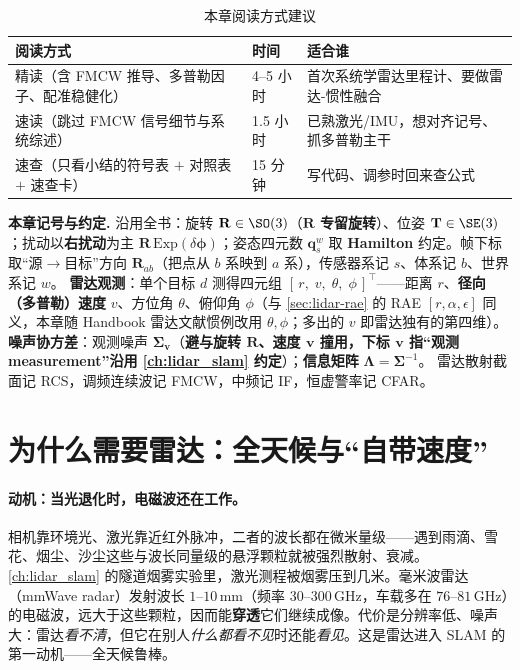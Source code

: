 \begin{table}[H]\centering\small
\caption{本章阅读方式建议}
\label{tab:radar-reading}
\begin{tabular}{lll}
\toprule
阅读方式 & 时间 & 适合谁 \\
\midrule
精读（含 FMCW 推导、多普勒因子、配准稳健化） & 4--5 小时 & 首次系统学雷达里程计、要做雷达-惯性融合 \\
速读（跳过 FMCW 信号细节与系统综述） & 1.5 小时 & 已熟激光/IMU，想对齐记号、抓多普勒主干 \\
速查（只看小结的符号表 $+$ 对照表 $+$ 速查卡） & 15 分钟 & 写代码、调参时回来查公式 \\
\bottomrule
\end{tabular}
\end{table}

\begin{note}
\textbf{本章记号与约定.}\;
沿用全书：旋转 $\mathbf R\in\SO(3)$（\textbf{$\mathbf R$ 专留旋转}）、位姿 $\mathbf T\in\SE(3)$；扰动以\textbf{右扰动}为主 $\mathbf R\,\mathrm{Exp}(\delta\boldsymbol\phi)$；姿态四元数 $\mathbf q_s^w$ 取 \textbf{Hamilton} 约定。帧下标取“源$\to$目标”方向 $\mathbf R_{ab}$（把点从 $b$ 系映到 $a$ 系），传感器系记 $s$、体系记 $b$、世界系记 $w$。
\textbf{雷达观测}：单个目标 $d$ 测得四元组 $[\,r,\;v,\;\theta,\;\phi\,]^\top$——距离 $r$、\textbf{径向（多普勒）速度} $v$、方位角 $\theta$、俯仰角 $\phi$（与 \cref{sec:lidar-rae} 的 RAE $[r,\alpha,\epsilon]$ 同义，本章随 Handbook 雷达文献惯例改用 $\theta,\phi$；多出的 $v$ 即雷达独有的第四维）。
\textbf{噪声协方差}：观测噪声 $\boldsymbol\Sigma_{\mathbf v}$（\textbf{避与旋转 $\mathbf R$、速度 $\mathbf v$ 撞用，下标 $\mathbf v$ 指“观测 measurement”沿用 \cref{ch:lidar_slam} 约定}）；\textbf{信息矩阵} $\boldsymbol\Lambda=\boldsymbol\Sigma^{-1}$。
雷达散射截面记 RCS，调频连续波记 FMCW，中频记 IF，恒虚警率记 CFAR。
\end{note}

\section{为什么需要雷达：全天候与“自带速度”}
\label{sec:radar-why}

\paragraph{动机：当光退化时，电磁波还在工作。}
相机靠环境光、激光靠近红外脉冲，二者的波长都在微米量级——遇到雨滴、雪花、烟尘、沙尘这些与波长同量级的悬浮颗粒就被强烈散射、衰减。\cref{ch:lidar_slam} 的隧道烟雾实验里，激光测程被烟雾压到几米。毫米波雷达（mmWave radar）发射波长 $1$--$10$\,mm（频率 $30$--$300$\,GHz，车载多在 $76$--$81$\,GHz）的电磁波，远大于这些颗粒，因而能\textbf{穿透}它们继续成像\cite{carlone2026handbook}。代价是分辨率低、噪声大：雷达\emph{看不清}，但它在别人\emph{什么都看不见}时还能\emph{看见}。这是雷达进入 SLAM 的第一动机——全天候鲁棒。

